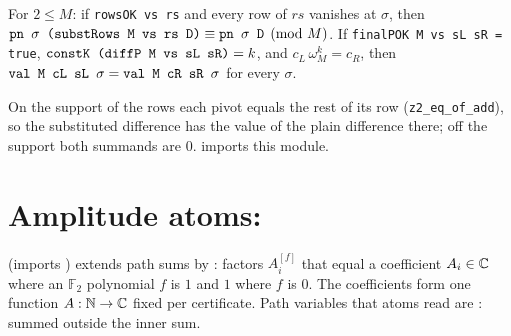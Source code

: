 \begin{theorem}
For $2\le M$: if \textnormal{\texttt{rowsOK vs rs}} and every row of $rs$ vanishes at $\sigma$, then
$\textnormal{\texttt{pn \ensuremath{\sigma} (substRows M vs rs D)}}\equiv\textnormal{\texttt{pn \ensuremath{\sigma} D}}\pmod M$. If
\textnormal{\texttt{finalPOK M vs sL sR = true}}, $\textnormal{\texttt{constK (diffP M vs sL sR)}}=k$, and $c_L\,\omega_M^k = c_R$,
then $\textnormal{\texttt{val M cL sL \ensuremath{\sigma}}} = \textnormal{\texttt{val M cR sR \ensuremath{\sigma}}}$ for every $\sigma$.
\end{theorem}
\noindent On the support of the rows each pivot equals the rest of its row
(\textnormal{\texttt{z2\_eq\_of\_add}}), so the substituted difference has the value of the plain difference
there; off the support both summands are $0$.  imports this module.

\section{Amplitude atoms: \texorpdfstring{}{PathSumAmp}}\label{sec:lean-pathsum-amp}

 (imports ) extends path sums by : factors
$A_i^{[f]}$ that equal a coefficient $A_i\in\mathbb{C}$ where an $\mathbb F_2$ polynomial $f$ is $1$ and
$1$ where $f$ is $0$. The coefficients form one function $A:\mathbb{N}\to\mathbb{C}$ fixed per certificate. Path
variables that atoms read are : summed outside the inner sum.

